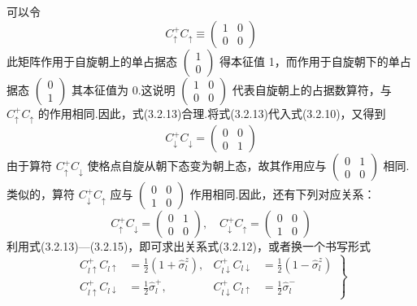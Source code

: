 可以令
\begin{equation}
  C_{\uparrow}^{+}C_{\uparrow}\equiv\begin{pmatrix}1&0\\0&0\end{pmatrix}
\end{equation}
此矩阵作用于自旋朝上的单占据态 $\begin{pmatrix}1\\0\end{pmatrix}$ 得本征值 1，而作用于自旋朝下的单占据态
$\begin{pmatrix}0\\1\end{pmatrix}$ 其本征值为 0.这说明 $\begin{pmatrix}1&0\\0&0\end{pmatrix}$ 代表自旋朝上的占据数算符，与
$C_{\uparrow}^{+}C_{\uparrow}$ 的作用相同.因此，式(3.2.13)合理.将式(3.2.13)代入式(3.2.10)，又得到
\begin{equation}
  C_{\downarrow}^{+}C_{\downarrow}=\begin{pmatrix}0&0\\0&1\end{pmatrix}
\end{equation}
由于算符 $C_{\uparrow}^{+}C_{\downarrow}$ 使格点自旋从朝下态变为朝上态，故其作用应与
$\begin{pmatrix}0&1\\0&0\end{pmatrix}$ 相同.类似的，算符 $C_{\downarrow}^{+}C_{\uparrow}$ 应与
$\begin{pmatrix}0&0\\1&0\end{pmatrix}$ 作用相同.因此，还有下列对应关系：
\begin{equation}
  C_{\uparrow}^{+}C_{\downarrow}=\begin{pmatrix}0&1\\0&0\end{pmatrix},\quad
  C_{\downarrow}^{+}C_{\uparrow}=\begin{pmatrix}0&0\\1&0\end{pmatrix}
\end{equation}
利用式(3.2.13)—(3.2.15)，即可求出关系式(3.2.12)，或者换一个书写形式
\begin{equation}
  \left.\begin{aligned}
    C_{l\uparrow}^{+}C_{l\uparrow}&=\frac{1}{2}\left(1+\hat{\sigma}_l^{z}\right),&
    C_{l\downarrow}^{+}C_{l\downarrow}&=\frac{1}{2}\left(1-\hat{\sigma}_l^{z}\right)\\
    C_{l\uparrow}^{+}C_{l\downarrow}&=\frac{1}{2}\hat{\sigma}_l^{+},&
    C_{l\downarrow}^{+}C_{l\uparrow}&=\frac{1}{2}\hat{\sigma}_l^{-}
  \end{aligned}\right\}
\end{equation}
